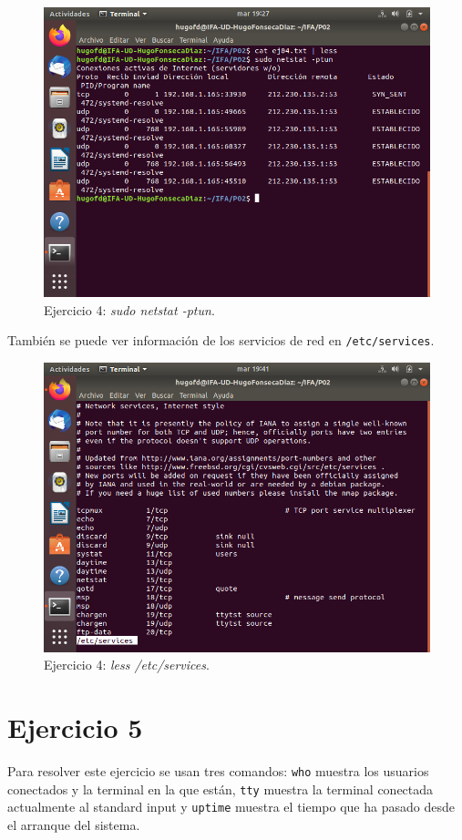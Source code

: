 \documentclass[11pt]{article}
\begin{document}
\begin{figure}[H]
    \caption{Ejercicio 4: \textit{sudo netstat -ptun}.}
  \centering
  \includegraphics{e4-2.png}
\end{figure}

También se puede ver información de los servicios de red en \verb|/etc/services|.

\begin{figure}[H]
    \caption{Ejercicio 4: \textit{less /etc/services}.}
  \centering
  \includegraphics{e4-3.png}
\end{figure}

\section{Ejercicio 5}
Para resolver este ejercicio se usan tres comandos: \verb|who| muestra los usuarios conectados y la terminal en la que están, \verb|tty| muestra la terminal conectada actualmente al standard input y \verb|uptime| muestra el tiempo que ha pasado desde el arranque del sistema.
\end{document}
